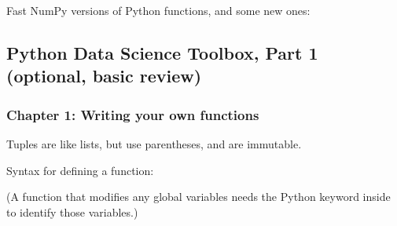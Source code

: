\documentclass[letterpaper,10pt,english]{jupyterBook}
\begin{document}
\sphinxAtStartPar
Fast NumPy versions of Python functions, and some new ones:

\begin{sphinxVerbatim}[commandchars=\\\{\}]
  
  
  
  
  
\end{sphinxVerbatim}


\subsection{Python Data Science Toolbox, Part 1 (optional, basic review)}
\label{\detokenize{big-cheat-sheet:python-data-science-toolbox-part-1-optional-basic-review}}

\subsubsection{Chapter 1: Writing your own functions}
\label{\detokenize{big-cheat-sheet:chapter-1-writing-your-own-functions}}
\sphinxAtStartPar
Tuples are like lists, but use parentheses, and are immutable.

\begin{sphinxVerbatim}[commandchars=\\\{\}]
              
\PYG{p}{[}\PYG{p}{]}                   
                
\end{sphinxVerbatim}

\sphinxAtStartPar
Syntax for defining a function:

\sphinxAtStartPar
(A function that modifies any global variables needs the Python  keyword inside to identify those variables.)

\begin{sphinxVerbatim}[commandchars=\\\{\}]
    
     
\end{sphinxVerbatim}
\end{document}
